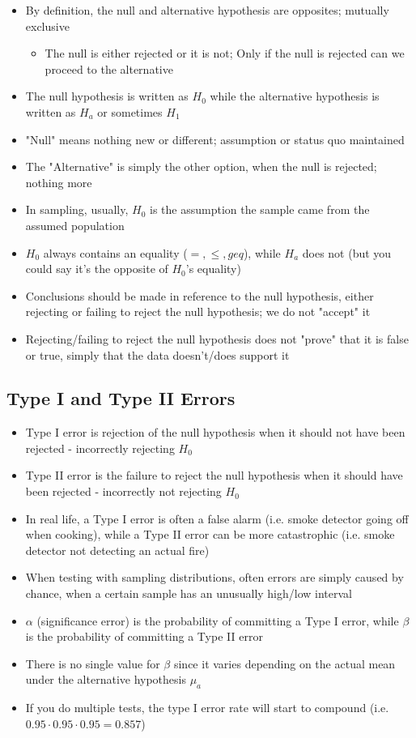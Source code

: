 \documentclass{article}
\begin{document}
\begin{itemize}
    \item By definition, the null and alternative hypothesis are opposites; mutually exclusive
    \begin{itemize}
        \item The null is either rejected or it is not; Only if the null is rejected can we proceed to the alternative
    \end{itemize}
    \item The null hypothesis is written as $H_0$ while the alternative hypothesis is written as $H_a$ or sometimes $H_1$
    \item "Null" means nothing new or different; assumption or status quo maintained
    \item The "Alternative" is simply the other option, when the null is rejected; nothing more
    \item In sampling, usually, $H_0$ is the assumption the sample came from the assumed population
    \item $H_0$ always contains an equality ($=,\leq,geq$), while $H_a$ does not (but you could say it's the opposite of $H_0$'s equality)
    \item Conclusions should be made in reference to the null hypothesis, either rejecting or failing to reject the null hypothesis; we do not "accept" it
    \item Rejecting/failing to reject the null hypothesis does not "prove" that it is false or true, simply that the data doesn't/does support it
\end{itemize}

\subsection{Type I and Type II Errors}

\begin{itemize}
    \item Type I error is rejection of the null hypothesis when it should not have been rejected - incorrectly rejecting $H_0$
    \item Type II error is the failure to reject the null hypothesis when it should have been rejected - incorrectly not rejecting $H_0$
    \item In real life, a Type I error is often a false alarm (i.e. smoke detector going off when cooking), while a Type II error can be more catastrophic (i.e. smoke detector not detecting an actual fire)
    \item When testing with sampling distributions, often errors are simply caused by chance, when a certain sample has an unusually high/low interval
    \item $\alpha$ (significance error) is the probability of committing a Type I error, while $\beta$ is the probability of committing a Type II error
    \item There is no single value for \(\beta\) since it varies depending on the actual mean under the alternative hypothesis \(\mu_a\)    
    \item If you do multiple tests, the type I error rate will start to compound (i.e. $0.95 \cdot 0.95 \cdot 0.95=0.857$)
\end{itemize}
\end{document}
